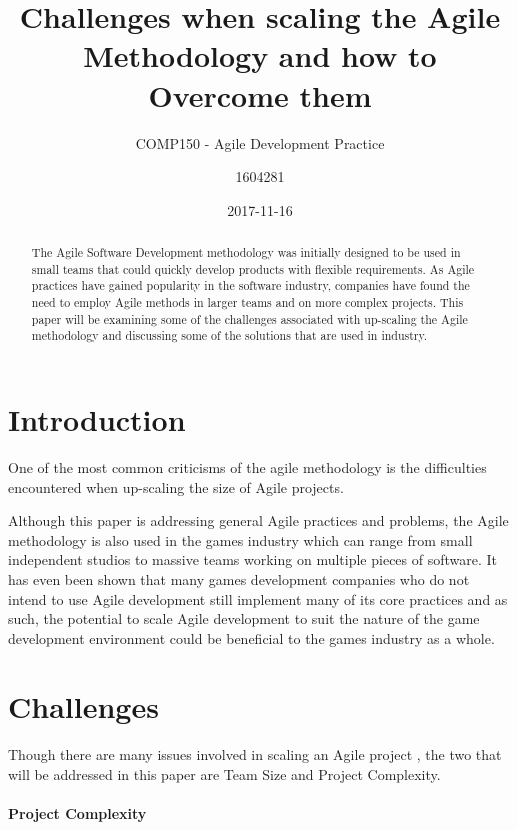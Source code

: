 \documentclass{scrartcl}
\title{Challenges when scaling the Agile Methodology and how to Overcome them}
\subtitle{COMP150 - Agile Development Practice}
\date{2017-11-16}
\author{1604281}
\begin{document}
\maketitle
{}

\begin{abstract}
	The Agile Software Development methodology was initially designed to be used in small teams that could quickly develop products with flexible requirements. As Agile practices have gained popularity in the software industry, companies have found the need to employ Agile methods in larger teams and on more complex projects. This paper will be examining some of the challenges associated with up-scaling the Agile methodology and discussing some of the solutions that are used in industry.
\end{abstract}

\section{Introduction}

One of the most common criticisms of the agile methodology is the difficulties encountered when up-scaling the size of Agile projects. \cite{begel2007usage}

Although this paper is addressing general Agile practices and problems, the Agile methodology is also used in the games industry \cite{politowski2016old} which can range from small independent studios to massive teams working on multiple pieces of software. It has even been shown that many games development companies who do not intend to use Agile development still implement many of its core practices \cite{petrillo2010agility} and as such, the potential to scale Agile development to suit the nature of the game development environment could be beneficial to the games industry as a whole. 

\section{Challenges}

Though there are many issues involved in scaling an Agile project \cite{turk2014limitations}, the two that will be addressed in this paper are Team Size and Project Complexity. 

\paragraph{Project Complexity}\mbox{}\newline
\end{document}
